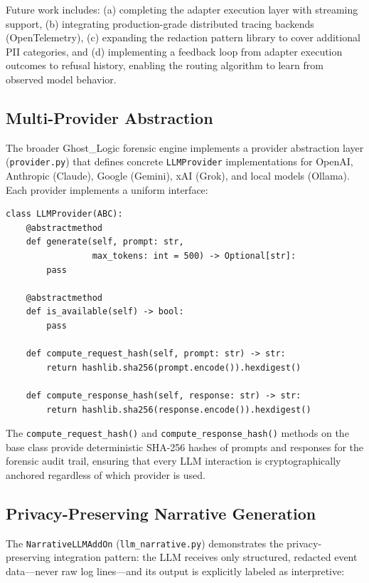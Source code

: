 \documentclass[11pt,a4paper]{article}
\theoremstyle{plain}
\theoremstyle{definition}
\begin{document}
Future work includes: (a) completing the adapter execution layer with streaming
support, (b) integrating production-grade distributed tracing backends
(OpenTelemetry), (c) expanding the redaction pattern library to cover additional
PII categories, and (d) implementing a feedback loop from adapter execution
outcomes to refusal history, enabling the routing algorithm to learn from
observed model behavior.

\subsection*{Multi-Provider Abstraction}

The broader Ghost\_Logic forensic engine implements a provider abstraction layer
(\texttt{provider.py}) that defines concrete \texttt{LLMProvider}
implementations for OpenAI, Anthropic (Claude), Google (Gemini), xAI (Grok),
and local models (Ollama). Each provider implements a uniform interface:

\begin{lstlisting}[style=pythonstyle, caption={LLMProvider abstract interface from \texttt{provider.py}}]
class LLMProvider(ABC):
    @abstractmethod
    def generate(self, prompt: str,
                 max_tokens: int = 500) -> Optional[str]:
        pass

    @abstractmethod
    def is_available(self) -> bool:
        pass

    def compute_request_hash(self, prompt: str) -> str:
        return hashlib.sha256(prompt.encode()).hexdigest()

    def compute_response_hash(self, response: str) -> str:
        return hashlib.sha256(response.encode()).hexdigest()
\end{lstlisting}

The \texttt{compute\_request\_hash()} and \texttt{compute\_response\_hash()}
methods on the base class provide deterministic SHA-256 hashes of prompts and
responses for the forensic audit trail, ensuring that every LLM interaction is
cryptographically anchored regardless of which provider is used.

\subsection*{Privacy-Preserving Narrative Generation}

The \texttt{NarrativeLLMAddOn} (\texttt{llm\_narrative.py}) demonstrates the
privacy-preserving integration pattern: the LLM receives only structured,
redacted event data---never raw log lines---and its output is explicitly labeled
as interpretive:
\end{document}
